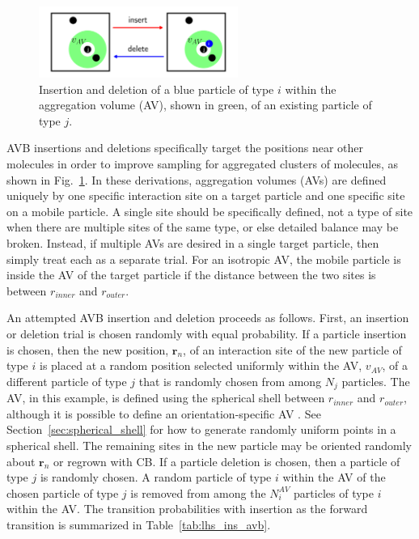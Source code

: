 \documentclass[
  9pt,
  bestpractices,
]{livecoms}
\begin{document}
\begin{figure}
\begin{centering}
\includegraphics[width=6.5cm]{../figures/avb.png}
\caption{
Insertion and deletion of a blue particle of type $i$ within the aggregation volume (AV), shown in green, of an existing particle of type $j$.
}
\label{fig:avb_gce}
\end{centering}
\end{figure}

AVB insertions and deletions specifically target the positions near other molecules \cite{chen_improving_2001} in order to improve sampling for aggregated clusters of molecules, as shown in Fig.~\ref{fig:avb_gce}.
In these derivations, aggregation volumes (AVs) are defined uniquely by one specific interaction site on a target particle and one specific site on a mobile particle.
A single site should be specifically defined, not a type of site when there are multiple sites of the same type, or else detailed balance may be broken.
Instead, if multiple AVs are desired in a single target particle, then simply treat each as a separate trial.
For an isotropic AV, the mobile particle is inside the AV of the target particle if the distance between the two sites is between $r_{inner}$ and $r_{outer}$.

An attempted AVB insertion and deletion proceeds as follows.
First, an insertion or deletion trial is chosen randomly with equal probability.
If a particle insertion is chosen, then the new position, $\mathbf{r}_n$, of an interaction site of the new particle of type $i$ is placed at a random position selected uniformly within the AV, $v_{AV}$, of a different particle of type $j$ that is randomly chosen from among $N_j$ particles.
The AV, in this example, is defined using the spherical shell between $r_{inner}$ and $r_{outer}$, although it is possible to define an orientation-specific AV \cite{rovigatti_how_2018}.
See Section~\ref{sec:spherical_shell} for how to generate randomly uniform points in a spherical shell.
The remaining sites in the new particle may be oriented randomly about $\mathbf{r}_n$ or regrown with CB.
If a particle deletion is chosen, then a particle of type $j$ is randomly chosen.
A random particle of type $i$ within the AV of the chosen particle of type $j$ is removed from among the $N_i^{AV}$ particles of type $i$ within the AV.
The transition probabilities with insertion as the forward transition is summarized in Table~\ref{tab:lhs_ins_avb}.
\end{document}
